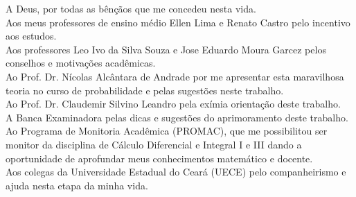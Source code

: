 A Deus, por todas as bênçãos que me concedeu nesta vida.\\
Aos meus professores de ensino médio Ellen Lima e Renato Castro pelo incentivo aos estudos.\\
Aos professores Leo Ivo da Silva Souza e Jose Eduardo Moura Garcez pelos conselhos e motivações acadêmicas.\\
Ao Prof. Dr. Nícolas Alcântara de Andrade por me apresentar esta maravilhosa teoria no curso de probabilidade e pelas sugestões neste trabalho. \\
Ao Prof. Dr. Claudemir Silvino Leandro pela exímia orientação deste trabalho.\\
A Banca Examinadora pelas dicas e sugestões do aprimoramento deste trabalho.\\
Ao Programa de Monitoria Acadêmica (PROMAC), que me possibilitou ser monitor da disciplina de Cálculo Diferencial e Integral I e III dando a oportunidade de aprofundar meus conhecimentos matemático e docente.\\
Aos colegas da Universidade Estadual do Ceará (UECE) pelo companheirismo e ajuda nesta etapa da minha vida.\\




